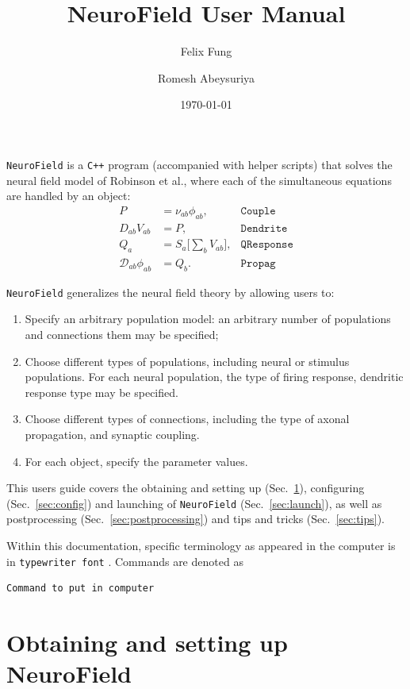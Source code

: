 \documentclass[12pt,a4paper]{article}
\title{NeuroField User Manual}
\author{Felix Fung \and Romesh Abeysuriya}
\date{\today}
\newcommand{\type}[1]{ {\small\small\tt #1} }
\newcommand{\NF}[0]{ \type{NeuroField}}
\begin{document}
\maketitle

\NF is a \type{C++} program (accompanied with helper scripts) that solves the neural field model of Robinson et al., where each of the simultaneous equations are handled by an object:
\begin{align*}
	P &= \nu_{ab}\phi_{ab}, & \mathtt{Couple}\\
	D_{ab}V_{ab} &= P, & \mathtt{Dendrite}\\
	Q_a &= S_a \big[\sum_b V_{ab} \big], & \mathtt{QResponse}\\
	\mathcal{D}_{ab}\phi_{ab} &= Q_b.&  \mathtt{Propag}
\end{align*}

\NF generalizes the neural field theory by allowing users to:
\begin{enumerate}
	\item Specify an arbitrary population model: an arbitrary number of populations and connections them may be specified;
	\item Choose different types of populations, including neural or stimulus populations. For each neural population, the type of firing response, dendritic response type may be specified.
	\item Choose different types of connections, including the type of axonal propagation, and synaptic coupling.
	\item For each object, specify the parameter values.
\end{enumerate}

This users guide covers the obtaining and setting up (Sec.~\ref{sec:obtain}), configuring (Sec.~\ref{sec:config}) and launching of \NF (Sec.~\ref{sec:launch}), as well as postprocessing (Sec.~\ref{sec:postprocessing}) and tips and tricks (Sec.~\ref{sec:tips}).

Within this documentation, specific terminology as appeared in the computer is in \type{typewriter font}. Commands are denoted as
\begin{lstlisting}
Command to put in computer
\end{lstlisting}

\pagebreak
\tableofcontents

\section{Obtaining and setting up NeuroField}
\label{sec:obtain}
\end{document}
